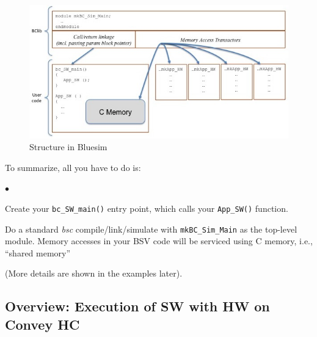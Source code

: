 \documentclass[twoside,letterpaper,11pt]{article}
\newenvironment{tightlist}%
{\begin{list}{$\bullet$}{%
    \setlength{\topsep}{0in}
    \setlength{\partopsep}{0in}
    \setlength{\itemsep}{0in}
    \setlength{\parsep}{0in}
    \setlength{\leftmargin}{1.5em}
    \setlength{\rightmargin}{0in}
    \setlength{\itemindent}{0in}
}
}%
{\end{list}
}
\begin{document}
\begin{figure}[htbp]
  \centerline{\includegraphics[width=6.5in,angle=0]{Figures/Fig_sim_structure}}
  \caption{\label{Fig_sim_structure}Structure in Bluesim}
\end{figure}

To summarize, all you have to do is:
\begin{tightlist}
\item Create your \verb|bc_SW_main()| entry point, which calls your
  \verb|App_SW()| function.
\item Do a standard \emph{bsc} compile/link/simulate with
  \verb|mkBC_Sim_Main| as the top-level module.  Memory accesses in
  your BSV code will be serviced using C memory, i.e., ``shared memory''
\end{tightlist}
(More details are shown in the examples later).


\subsection{Overview: Execution of SW with HW on Convey HC}

\label{sec_overview_HC}
\end{document}
